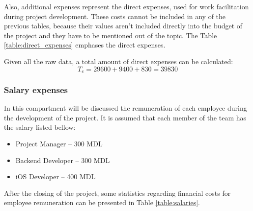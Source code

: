 \documentclass[12pt,a4paper,titlepage]{article}
\begin{document}
Also, additional expenses represent the direct expenses, used for work facilitation during project development. These costs cannot be included in any of the previous tables, because their values aren't included directly into the budget of the project and they have to be mentioned out of the topic. The Table \ref{table:direct_expenses} emphases the direct expenses.

\begin{table}[H]
\centering
\caption{Direct expenses}
\label{table:direct_expenses}
\end{table}

Given all the raw data, a total amount of direct expenses can be calculated: 
\begin{equation}
 T_{e} = 29600 + 9400 + 830 = 39830
\end{equation}

\subsubsection{Salary expenses}
In this compartment will be discussed the remuneration of each employee during the development of the project. It is assumed that each member of the team has the salary listed bellow:

\begin{itemize}
\item Project Manager – 300 MDL
\item Backend Developer – 300 MDL
\item iOS Developer – 400 MDL
\end{itemize}

After the closing of the project, some statistics regarding financial costs for employee remuneration can be presented in Table \ref{table:salaries}.
\end{document}
